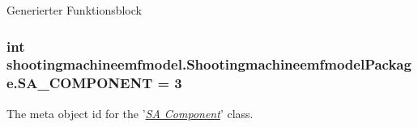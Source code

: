 Generierter Funktionsblock  \hypertarget{interfaceshootingmachineemfmodel_1_1_shootingmachineemfmodel_package_a9fd6d4bea46299ebbede2da5a88ff984}{
\subsubsection[{S\-A\-\_\-\-C\-O\-M\-P\-O\-N\-E\-N\-T}]{\setlength{\rightskip}{0pt plus 5cm}int shootingmachineemfmodel.\-Shootingmachineemfmodel\-Package.\-S\-A\-\_\-\-C\-O\-M\-P\-O\-N\-E\-N\-T = 3}}\label{interfaceshootingmachineemfmodel_1_1_shootingmachineemfmodel_package_a9fd6d4bea46299ebbede2da5a88ff984}
The meta object id for the '\hyperlink{classshootingmachineemfmodel_1_1impl_1_1_s_a___component_impl}{{\itshape S\-A Component}}' class.

